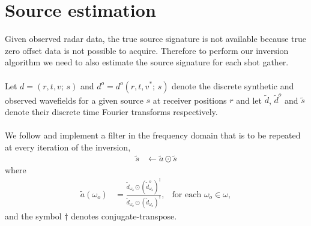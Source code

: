 \documentclass[a4paper,12pt]{article}
\begin{document}
\section*{Source estimation}
Given observed radar data, the true source signature is not available because true zero offset data is not possible to acquire. Therefore to perform our inversion algorithm we need to also estimate the source signature for each shot gather.
\\\\ 
Let $d=(r,t,v;\,s)$ and $d^o=d^o(r,t,v^*;\,s)$ denote the discrete synthetic and observed wavefields for a given source $s$ at receiver positions $r$ and let $\tilde{d}$, $\tilde{d}^o$ and $\tilde{s}$ denote their discrete time Fourier transforms respectively. 
\\\\
We follow \cite{pratt1999seismic} and implement a filter in the frequency domain that is to be repeated at every iteration of the inversion,
\begin{align}
\tilde{s} &\gets \tilde{a}\odot\tilde{s}
\end{align}
where
\begin{align}
\tilde{a}(\omega_o) &= \frac{\tilde{d}_{\omega_o}\odot (\tilde{d}^o_{\omega_o})^\dagger }{\tilde{d}_{\omega_o}\odot (\tilde{d}_{\omega_o})^\dagger }, & \text{for each $\omega_o\in\omega$},
\end{align}
and the symbol $\dagger$ denotes conjugate-transpose.
%
\end{document}
